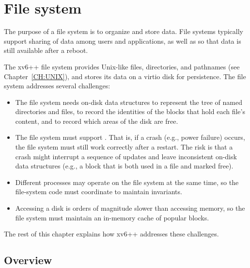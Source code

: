 \chapter{File system}
\label{CH:FS}

The purpose of a file system is to organize and store data. File systems
typically support sharing of data among users and applications, as well as
so that data is still available after a reboot.

The xv6++ file system provides Unix-like files, directories, and pathnames
(see Chapter~\ref{CH:UNIX}), and stores its data on a virtio disk for
persistence. The file system addresses several challenges:
\begin{itemize}

\item The file system needs on-disk data structures to represent the tree
of named directories and files, to record the identities of the
blocks that hold each file's content, and to record which areas
of the disk are free.

\item The file system must support
.
That is, if a crash (e.g., power failure) occurs, the file system must
still work correctly after a restart. The risk is that a crash might
interrupt a sequence of updates and leave inconsistent on-disk data
structures (e.g., a block that is both used in a file and marked free).

\item Different processes may operate on the file system at the same time,
so the file-system code must coordinate to maintain invariants.

\item Accessing a disk is orders of magnitude slower than accessing
memory, so the file system must maintain an in-memory cache of
popular blocks.

\end{itemize}

The rest of this chapter explains how xv6++ addresses these challenges.

\section{Overview}

